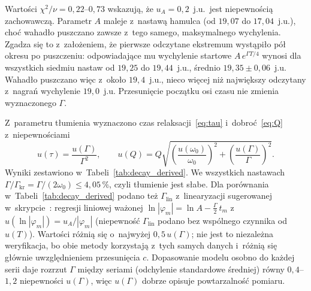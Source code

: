\documentclass[12pt, a4paper]{article}
\begin{document}
Wartości $\chi^2/\nu = 0{,}22$--$0{,}73$ wskazują, że $u_A = 0{,}2$~j.u.\ jest
niepewnością zachowawczą. Parametr $A$ maleje z~nastawą hamulca (od $19{,}07$
do $17{,}04$~j.u.), choć wahadło puszczano zawsze z~tego samego, maksymalnego
wychylenia. Zgadza się to z~założeniem, że pierwsze odczytane ekstremum wystąpiło
pół okresu po puszczeniu: odpowiadające mu wychylenie startowe $A\,e^{\Gamma T/4}$
wynosi dla wszystkich siedmiu nastaw od $19{,}25$ do $19{,}44$~j.u., średnio
$19{,}35 \pm 0{,}06$~j.u. Wahadło puszczano więc z~około $19{,}4$~j.u., nieco więcej
niż największy odczytany z~nagrań wychylenie $19{,}0$~j.u. Przesunięcie początku osi
czasu nie zmienia wyznaczonego $\Gamma$.

Z~parametru tłumienia wyznaczono czas relaksacji~\eqref{eq:tau} i~dobroć~\eqref{eq:Q}
z~niepewnościami
\begin{equation}
    u(\tau) = \frac{u(\Gamma)}{\Gamma^2}, \qquad
    u(Q) = Q\sqrt{\left(\frac{u(\omega_0)}{\omega_0}\right)^2 + \left(\frac{u(\Gamma)}{\Gamma}\right)^2}.
    \label{eq:tau_Q}
\end{equation}
Wyniki zestawiono w~Tabeli~\ref{tab:decay_derived}. We wszystkich nastawach
$\Gamma/\Gamma_\text{kr} = \Gamma/(2\omega_0) \leq 4{,}05\,\%$, czyli tłumienie jest słabe.
Dla porównania w~Tabeli~\ref{tab:decay_derived} podano też $\Gamma_\text{lin}$
z~linearyzacji sugerowanej w~skrypcie~\cite{skrypt}: regresji liniowej ważonej
$\ln|\varphi_m| = \ln A - \tfrac{\Gamma}{2}\,t_m$ z~$u(\ln|\varphi_m|) = u_A/|\varphi_m|$
(niepewność $\Gamma_\text{lin}$ podano bez wspólnego czynnika od $u(T)$).
Wartości różnią się o~najwyżej $0{,}5\,u(\Gamma)$; nie jest to niezależna weryfikacja,
bo obie metody korzystają z~tych samych danych i~różnią się głównie uwzględnieniem
przesunięcia $c$. Dopasowanie modelu osobno do każdej serii daje rozrzut $\Gamma$
między seriami (odchylenie standardowe średniej) równy $0{,}4$--$1{,}2$ niepewności
$u(\Gamma)$, więc $u(\Gamma)$ dobrze opisuje powtarzalność pomiaru.
\end{document}
